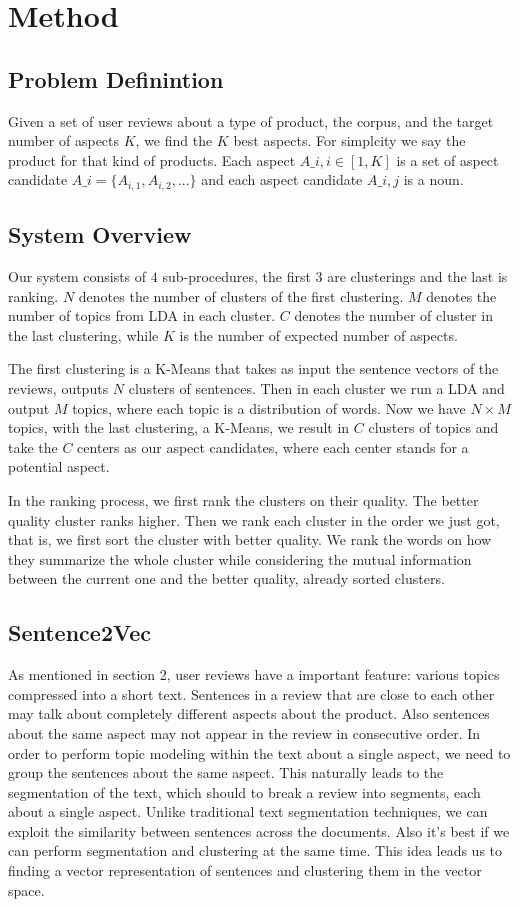 \section{Method}
\subsection{Problem Definintion}
Given a set of user reviews about a type of product, the corpus, and the target number of aspects $K$, we find the $K$ best aspects. For simplcity we say the product for that kind of products. Each aspect $A\_i, i\in [1, K]$ is a set of aspect candidate $A\_i = \{A_{i, 1}, A_{i,2}, ...\}$ and each aspect candidate $A\_{i,j}$ is a noun. 

\subsection{System Overview}
Our system consists of $4$ sub-procedures, the first $3$ are clusterings and the last is ranking. $N$ denotes the number of clusters of the first clustering. $M$ denotes the number of topics from LDA in each cluster. $C$ denotes the number of cluster in the last clustering, while $K$ is the number of expected number of aspects. 

The first clustering is a K-Means that takes as input the sentence vectors of the reviews, outputs $N$ clusters of sentences. Then in each cluster we run a LDA and output $M$ topics, where each topic is a distribution of words. Now we have $N\times M$ topics, with the last clustering, a K-Means, we result in $C$ clusters of topics and take the $C$ centers as our aspect candidates, where each center stands for a potential aspect.

In the ranking process, we first rank the clusters on their quality. The better quality cluster ranks higher. Then we rank each cluster in the order we just got, that is, we first sort the cluster with better quality. We rank the words on how they summarize the whole cluster while considering the mutual information between the current one and the better quality, already sorted clusters.

\subsection{Sentence2Vec}
As mentioned in section 2, user reviews have a important feature: various topics compressed into a short text. Sentences in a review that are close to each other may talk about completely different aspects about the product. Also sentences about the same aspect may not appear in the review in consecutive order. In order to perform topic modeling within the text about a single aspect, we need to group the sentences about the same aspect. This naturally leads to the segmentation of the text, which should to break a review into segments, each about a single aspect. Unlike traditional text segmentation techniques, we can exploit the similarity between sentences across the documents. Also it’s best if we can perform segmentation and clustering at the same time. This idea leads us to finding a vector representation of sentences and clustering them in the vector space.

